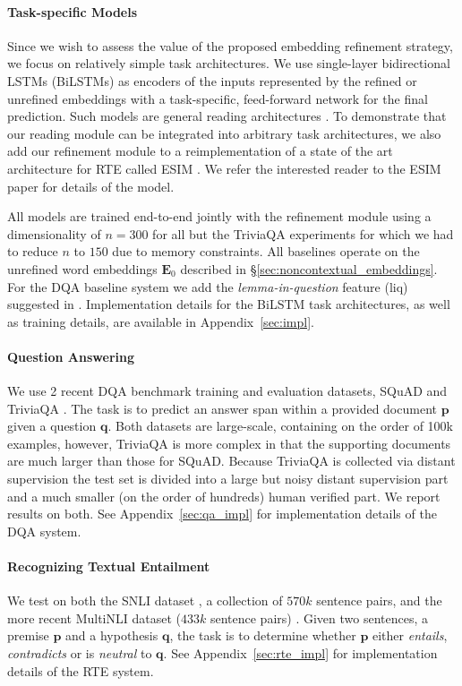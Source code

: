 \documentclass[11pt,a4paper]{article}
\begin{document}
\paragraph{Task-specific Models}
Since we wish to assess the value of the proposed embedding refinement strategy, we focus on relatively simple task architectures. We use single-layer bidirectional LSTMs (BiLSTMs) as encoders of the inputs represented by the refined or unrefined embeddings with a task-specific, feed-forward network for the final prediction. Such models are general reading architectures \cite{Bowman2015,Rocktschel2015,Weissenborn2017}. To demonstrate that our reading module can be integrated into arbitrary task architectures, we also add our refinement module to a reimplementation of a state of the art architecture for RTE called ESIM \citep{Chen2017_ESIM}. We refer the interested reader to the ESIM paper for details of the model.

All models are trained end-to-end jointly with the refinement module using a dimensionality of $n=300$ for all but the TriviaQA experiments for which we had to reduce $n$ to $150$ due to memory constraints. All baselines operate on the unrefined word embeddings $\mathbf{E}_0$ described in \S\ref{sec:noncontextual_embeddings}. For the DQA baseline system we add the \textit{lemma-in-question} feature (liq) suggested in \citet{Weissenborn2017}. Implementation details for the BiLSTM task architectures, as well as training details, are available in Appendix~\ref{sec:impl}.

\paragraph{Question Answering} We use 2 recent DQA benchmark training and evaluation datasets, SQuAD \citep{Rajpurkar2016} and TriviaQA \citep{JoshiTriviaQA2017}. The task is to predict an answer span within a provided document $\boldsymbol{p}$ given a question $\boldsymbol{q}$. Both datasets are large-scale, containing on the order of 100k examples, however, TriviaQA is more complex in that the supporting documents are much larger than those for SQuAD. Because TriviaQA is collected via distant supervision the test set is divided into a large but noisy distant supervision part and a much smaller (on the order of hundreds) human verified part. We report results on both. See Appendix~\ref{sec:qa_impl} for implementation details of the DQA system.

\paragraph{Recognizing Textual Entailment} We test on both the SNLI dataset \citep{Bowman2015}, a collection of $570k$ sentence pairs, and the more recent MultiNLI dataset ($433k$ sentence pairs) \citep{williams2017broad}. Given two sentences, a premise $\boldsymbol{p}$ and a hypothesis $\boldsymbol{q}$, the task is to determine whether $\boldsymbol{p}$ either \textit{entails}, \textit{contradicts} or is \textit{neutral} to $\boldsymbol{q}$. See Appendix~\ref{sec:rte_impl} for implementation details of the RTE system.
\end{document}
